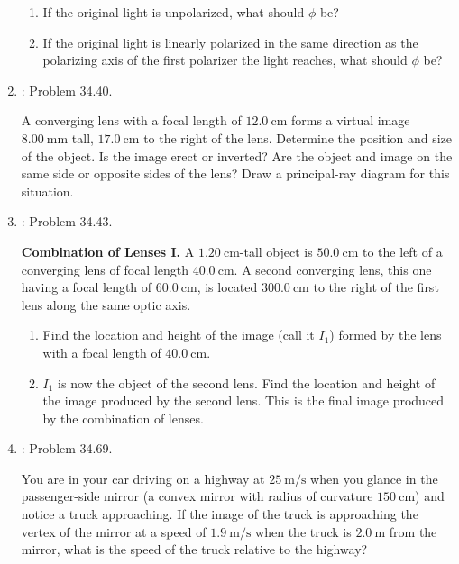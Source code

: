 \documentclass[../psets.tex]{subfiles}
\begin{document}
\begin{enumerate}[label={\arabic*)}]
\begin{center}
    \end{center}
    \begin{enumerate}
        \item If the original light is unpolarized, what should $\phi$ be?
        \item If the original light is linearly polarized in the same direction as the polarizing axis of the first polarizer the light reaches, what should $\phi$ be?
    \end{enumerate}
    \item \textcite{bib:YoungFreedman}: Problem 34.40.\par
    A converging lens with a focal length of $\SI{12.0}{\centi\meter}$ forms a virtual image $\SI{8.00}{\milli\meter}$ tall, $\SI{17.0}{\centi\meter}$ to the right of the lens. Determine the position and size of the object. Is the image erect or inverted? Are the object and image on the same side or opposite sides of the lens? Draw a principal-ray diagram for this situation.
    \item \textcite{bib:YoungFreedman}: Problem 34.43.\par
    \textbf{Combination of Lenses I.} A $\SI{1.20}{\centi\meter}$-tall object is $\SI{50.0}{\centi\meter}$ to the left of a converging lens of focal length $\SI{40.0}{\centi\meter}$. A second converging lens, this one having a focal length of $\SI{60.0}{\centi\meter}$, is located $\SI{300.0}{\centi\meter}$ to the right of the first lens along the same optic axis.
    \begin{enumerate}
        \item Find the location and height of the image (call it $I_1$) formed by the lens with a focal length of $\SI{40.0}{\centi\meter}$.
        \item $I_1$ is now the object of the second lens. Find the location and height of the image produced by the second lens. This is the final image produced by the combination of lenses.
    \end{enumerate}
    \item \textcite{bib:YoungFreedman}: Problem 34.69.\par
    You are in your car driving on a highway at $\SI{25}{\meter\per\second}$ when you glance in the passenger-side mirror (a convex mirror with radius of curvature $\SI{150}{\centi\meter}$) and notice a truck approaching. If the image of the truck is approaching the vertex of the mirror at a speed of $\SI{1.9}{\meter\per\second}$ when the truck is $\SI{2.0}{\meter}$ from the mirror, what is the speed of the truck relative to the highway?

\end{enumerate}
\end{document}
